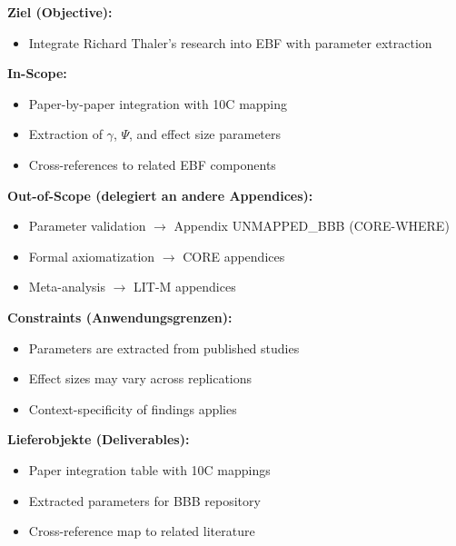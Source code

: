 
\begin{tcolorbox}[
    colback=orange!5!white,
    colframe=orange!75!black,
    title={\textbf{Appendix Scope: Ziel / In-Scope / Out-of-Scope / Constraints}},
    fonttitle=\bfseries
]

\textbf{Ziel (Objective):}
\begin{itemize}[nosep]
    \item Integrate Richard Thaler's research into EBF with parameter extraction
\end{itemize}

\textbf{In-Scope:}
\begin{itemize}[nosep]
    \item Paper-by-paper integration with 10C mapping
    \item Extraction of $\gamma$, $\Psi$, and effect size parameters
    \item Cross-references to related EBF components
\end{itemize}

\textbf{Out-of-Scope (delegiert an andere Appendices):}
\begin{itemize}[nosep]
    \item Parameter validation $\rightarrow$ Appendix UNMAPPED_BBB (CORE-WHERE)
    \item Formal axiomatization $\rightarrow$ CORE appendices
    \item Meta-analysis $\rightarrow$ LIT-M appendices
\end{itemize}

\textbf{Constraints (Anwendungsgrenzen):}
\begin{itemize}[nosep]
    \item Parameters are extracted from published studies
    \item Effect sizes may vary across replications
    \item Context-specificity of findings applies
\end{itemize}

\textbf{Lieferobjekte (Deliverables):}
\begin{itemize}[nosep]
    \item Paper integration table with 10C mappings
    \item Extracted parameters for BBB repository
    \item Cross-reference map to related literature
\end{itemize}

\end{tcolorbox}

